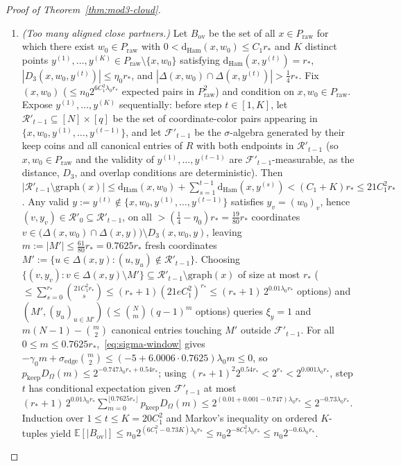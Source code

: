 \documentclass[11pt]{article}
\theoremstyle{definition}
\theoremstyle{remark}
\newcommand{\Ham}{\mathrm{Ham}}
\newcommand{\dHam}{\mathrm{d}_{\Ham}}
\begin{document}
\begin{proof}[Proof of Theorem~\ref{thm:mod3-cloud}]
\begin{enumerate}[label=(\arabic*),leftmargin=2em]
  \item \emph{(Too many aligned close partners.)} Let $B_{\mathrm{ov}}$ be the set of all $x \in P_{\mathrm{raw}}$ for which there exist $w_0 \in P_{\mathrm{raw}}$ with $0 < \dHam(x, w_0) \le C_1 r_*$ and $K$ distinct points $y^{(1)}, \dots, y^{(K)} \in P_{\mathrm{raw}} \setminus \{x, w_0\}$ satisfying $\dHam(x, y^{(t)}) = r_*$, $|D_3(x, w_0, y^{(t)})| \le \eta_0 r_*$, and $|\Delta(x, w_0) \cap \Delta(x, y^{(t)})| > \frac{1}{4} r_*$. Fix $(x, w_0)$ ($\le n_0 2^{6 C_1^2 \lambda_0 r_*}$ expected pairs in $P_{\mathrm{raw}}^2$) and condition on $x, w_0 \in P_{\mathrm{raw}}$. Expose $y^{(1)}, \dots, y^{(K)}$ sequentially: before step $t \in [1, K]$, let $\mathcal{R}'_{t-1} \subseteq [N] \times [q]$ be the set of coordinate-color pairs appearing in $\{x, w_0, y^{(1)}, \dots, y^{(t-1)}\}$, and let $\mathcal{F}'_{t-1}$ be the $\sigma$-algebra generated by their keep coins and all canonical entries of $R$ with both endpoints in $\mathcal{R}'_{t-1}$ (so $x, w_0 \in P_{\mathrm{raw}}$ and the validity of $y^{(1)}, \dots, y^{(t-1)}$ are $\mathcal{F}'_{t-1}$-measurable, as the distance, $D_3$, and overlap conditions are deterministic). Then $|\mathcal{R}'_{t-1} \setminus \mathrm{graph}(x)| \le \dHam(x, w_0) + \sum_{s=1}^{t-1} \dHam(x, y^{(s)}) < (C_1 + K) r_* \le 21 C_1^2 r_*$. Any valid $y := y^{(t)} \notin \{x, w_0, y^{(1)}, \dots, y^{(t-1)}\}$ satisfies $y_v = (w_0)_v$, hence $(v, y_v) \in \mathcal{R}'_0 \subseteq \mathcal{R}'_{t-1}$, on all $> (\frac{1}{4} - \eta_0) r_* = \frac{19}{80} r_*$ coordinates $v \in \bigl(\Delta(x, w_0) \cap \Delta(x, y)\bigr) \setminus D_3(x, w_0, y)$, leaving $m := |M'| \le \frac{61}{80} r_* = 0.7625 r_*$ fresh coordinates $M' := \{u \in \Delta(x, y) : (u, y_u) \notin \mathcal{R}'_{t-1}\}$. Choosing $\{(v, y_v) : v \in \Delta(x, y) \setminus M'\} \subseteq \mathcal{R}'_{t-1} \setminus \mathrm{graph}(x)$ of size at most $r_*$ ($\le \sum_{s=0}^{r_*} \binom{21 C_1^2 r_*}{s} \le (r_* + 1)(21 e C_1^2)^{r_*} \le (r_* + 1)\,2^{0.01 \lambda_0 r_*}$ options) and $(M', (y_u)_{u \in M'})$ ($\le \binom{N}{m}(q - 1)^m$ options) queries $\xi_y = 1$ and $m(N - 1) - \binom{m}{2}$ canonical entries touching $M'$ outside $\mathcal{F}'_{t-1}$. For all $0 \le m \le 0.7625 r_*$,~\eqref{eq:sigma-window} gives $-\gamma_0 m + \sigma_{\mathrm{edge}}\binom{m}{2} \le (-5 + 6.0006 \cdot 0.7625)\lambda_0 m \le 0$, so $p_{\mathrm{keep}} D_\Omega(m) \le 2^{-0.747 \lambda_0 r_* + 0.54 r_*}$; using $(r_* + 1)^2 2^{0.54 r_*} < 2^{r_*} < 2^{0.001\lambda_0 r_*}$, step $t$ has conditional expectation given $\mathcal{F}'_{t-1}$ at most $(r_* + 1)\,2^{0.01\lambda_0 r_*} \sum_{m=0}^{\lfloor 0.7625 r_* \rfloor} p_{\mathrm{keep}} D_\Omega(m) \le 2^{(0.01 + 0.001 - 0.747)\lambda_0 r_*} \le 2^{-0.73 \lambda_0 r_*}$. Induction over $1 \le t \le K = 20 C_1^2$ and Markov's inequality on ordered $K$-tuples yield $\mathbb{E}[|B_{\mathrm{ov}}|] \le n_0 2^{(6 C_1^2 - 0.73 K)\lambda_0 r_*} \le n_0 2^{-8 C_1^2 \lambda_0 r_*} \le n_0 2^{-0.6\lambda_0 r_*}$.

\end{enumerate}
\end{proof}
\end{document}
